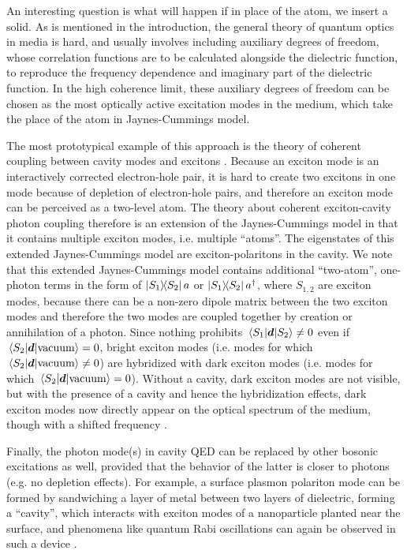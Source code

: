 \documentclass[hyperref, a4paper]{article}
\begin{document}
An interesting question is what will happen if in place of the atom,
we insert a solid.
As is mentioned in the introduction,
the general theory of quantum optics in media is hard,
and usually involves including auxiliary degrees of freedom,
whose correlation functions are to be calculated alongside the dielectric function,
to reproduce the frequency dependence and imaginary part of the dielectric function.
In the high coherence limit,
these auxiliary degrees of freedom can be chosen as
the most optically active excitation modes in the medium,
which take the place of the atom in Jaynes-Cummings model.

The most prototypical example of this approach 
is the theory of coherent coupling between cavity modes and excitons
\cite{latini2019cavity}.
Because an exciton mode is an interactively corrected electron-hole pair,
it is hard to create two excitons in one mode because of depletion of electron-hole pairs,
and therefore an exciton mode can be perceived as a two-level atom.
The theory about coherent exciton-cavity photon coupling
therefore is an extension of the Jaynes-Cummings model
in that it contains multiple exciton modes, i.e. multiple ``atoms''.
The eigenstates of this extended Jaynes-Cummings model
are exciton-polaritons in the cavity.
We note that this extended Jaynes-Cummings model
contains additional ``two-atom'', one-photon terms in the form of
$\dyad{S_1}{S_2} a$ or $\dyad{S_1}{S_2} a^\dag$,
where $S_{1,2}$ are exciton modes,
because there can be a non-zero dipole matrix between the two exciton modes
and therefore the two modes are coupled together by creation or annihilation of a photon.
Since nothing prohibits $\mel*{S_1}{\vb*{d}}{S_2} \neq 0$
even if $\mel*{S_2}{\vb*{d}}{\text{vacuum}} = 0$,
bright exciton modes (i.e. modes for which $\mel*{S_2}{\vb*{d}}{\text{vacuum}} \neq 0$)
are hybridized with dark exciton modes 
(i.e. modes for which $\mel*{S_2}{\vb*{d}}{\text{vacuum}} = 0$).
Without a cavity, dark exciton modes are not visible,
but with the presence of a cavity and hence the hybridization effects,
dark exciton modes now directly appear on the optical spectrum of the medium,
though with a shifted frequency \cite{latini2019cavity}.

Finally, the photon mode(s) in cavity QED can be replaced by other bosonic excitations as well,
provided that the behavior of the latter is closer to photons
(e.g. no depletion effects).
For example, a surface plasmon polariton mode can be formed 
by sandwiching a layer of metal between two layers of dielectric,
forming a ``cavity'', which interacts with exciton modes of a nanoparticle planted near the surface,
and phenomena like quantum Rabi oscillations can again be observed in such a device
\cite{gonzalez2014reversible}.
\end{document}
